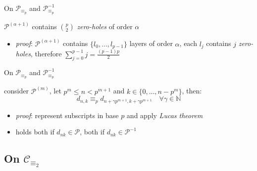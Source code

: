 \documentclass[10pt,serif, professionalfont]{beamer}
\begin{document}
\begin{frame}{On $\mathcal{P}_{\equiv_{p}}$ and $\mathcal{P}_{\equiv_{p}}^{-1}$}
    \begin{theorem}
         $\mathcal{P}^{(\alpha+1)}$ contains 
        ${{p}\choose{2}}$ \emph{zero-holes} of order $\alpha$
    \end{theorem}
    \begin{itemize}
        \item \emph{proof}: $\mathcal{P}^{(\alpha+1)}$ contains $\lbrace l_{0},\ldots,l_{p-1}\rbrace$ 
            layers of order $\alpha$, each $l_{j}$ contains $j$ \emph{zero-holes}, therefore
            $\sum_{j=0}^{p-1}{j}=\frac{(p-1)p}{2}$
    \end{itemize}
    
    
\end{frame}

\begin{frame}{On $\mathcal{P}_{\equiv_{p}}$ and $\mathcal{P}_{\equiv_{p}}^{-1}$}
    \begin{theorem}
        consider $\mathcal{P}^{(m)}$, let $p^{m} \leq n < p^{m+1}$ and 
        $k\in\lbrace0,\ldots,n-p^{m}\rbrace$, then:
        \begin{displaymath}
            d_{n,k} \equiv_{p} d_{n+\gamma p^{m+1}, k+\gamma p^{m+1}}
                \quad\forall\gamma\in\mathbb{N}
        \end{displaymath}
    \end{theorem}
    \begin{itemize}
        \item \emph{proof}: represent subscripts in base $p$ and apply \emph{Lucas theorem}
        \item holds both if $d_{nk}\in\mathcal{P}$, both if $d_{nk}\in\mathcal{P}^{-1}$
    \end{itemize}

    
\end{frame}

\subsection{On $\mathcal{C}_{\equiv_{2}}$}
\end{document}
